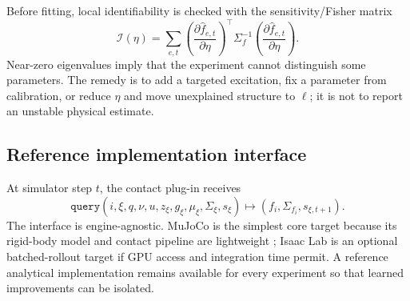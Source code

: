 Before fitting, local identifiability is checked with the sensitivity/Fisher matrix
\begin{equation}
\mathcal I(\eta)=\sum_{e,t}
\left(\frac{\partial \hat f_{e,t}}{\partial\eta}\right)^\top
\Sigma_f^{-1}
\left(\frac{\partial \hat f_{e,t}}{\partial\eta}\right).
\label{eq:fisher}
\end{equation}
Near-zero eigenvalues imply that the experiment cannot distinguish some parameters. The remedy is to add a targeted excitation, fix a parameter from calibration, or reduce $\eta$ and move unexplained structure to $\ell$; it is not to report an unstable physical estimate.

\subsection{Reference implementation interface}

At simulator step $t$, the contact plug-in receives
\begin{equation}
\texttt{query}(i,\xi,q,\nu,u,z_\xi,g_\xi,\mu_\xi,\Sigma_\xi,s_\xi)
\mapsto (f_i,\Sigma_{f_i},s_{\xi,t+1}).
\label{eq:api}
\end{equation}
The interface is engine-agnostic. MuJoCo is the simplest core target because its rigid-body model and contact pipeline are lightweight \citep{todorov2012mujoco}; Isaac Lab is an optional batched-rollout target if GPU access and integration time permit. A reference analytical implementation remains available for every experiment so that learned improvements can be isolated.
